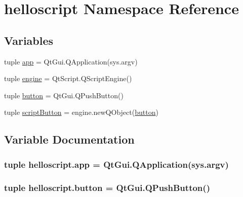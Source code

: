 \hypertarget{namespacehelloscript}{}\section{helloscript Namespace Reference}
\label{namespacehelloscript}
\subsection*{Variables}
\begin{DoxyCompactItemize}
\item 
tuple \hyperlink{namespacehelloscript_a9ff78e472cce4b7754566c3979ff7649}{app} = Qt\+Gui.\+Q\+Application(sys.\+argv)
\item 
tuple \hyperlink{namespacehelloscript_a6f91f11d9ba348ce8bcc2157967f0982}{engine} = Qt\+Script.\+Q\+Script\+Engine()
\item 
tuple \hyperlink{namespacehelloscript_ab0294b95eb24301b8c64702834f8ae1e}{button} = Qt\+Gui.\+Q\+Push\+Button()
\item 
tuple \hyperlink{namespacehelloscript_a28325ef134033c6b58dea9a4eb265263}{script\+Button} = engine.\+new\+Q\+Object(\hyperlink{namespacehelloscript_ab0294b95eb24301b8c64702834f8ae1e}{button})
\end{DoxyCompactItemize}


\subsection{Variable Documentation}
\hypertarget{namespacehelloscript_a9ff78e472cce4b7754566c3979ff7649}{}
\subsubsection[{app}]{\setlength{\rightskip}{0pt plus 5cm}tuple helloscript.\+app = Qt\+Gui.\+Q\+Application(sys.\+argv)}\label{namespacehelloscript_a9ff78e472cce4b7754566c3979ff7649}
\hypertarget{namespacehelloscript_ab0294b95eb24301b8c64702834f8ae1e}{}
\subsubsection[{button}]{\setlength{\rightskip}{0pt plus 5cm}tuple helloscript.\+button = Qt\+Gui.\+Q\+Push\+Button()}\label{namespacehelloscript_ab0294b95eb24301b8c64702834f8ae1e}
\hypertarget{namespacehelloscript_a6f91f11d9ba348ce8bcc2157967f0982}{}
